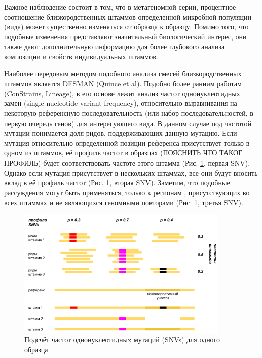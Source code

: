 \documentclass{spbau-diploma}
\begin{document}
Важное наблюдение состоит в том, что в метагеномной серии, процентное соотношение близкородственных штаммов определенной микробной популяции (вида) может существенно изменяться от образца к образцу. Помимо того, что подобные изменения представляют значительный биологический интерес, они также дают дополнительную информацию для более глубокого анализа композиции и свойств индивидуальных штаммов.

Наиболее передовым методом подобного анализа смесей близкородственных штаммов является DESMAN (Quince et al).
Подобно более ранним работам (ConStrains, Lineage), в его основе лежит анализ частот однонуклеотидных замен (single nucleotide variant frequency), относительно выравнивания на некоторую референсную последовательность (или набор последовательностей, в первую очередь генов) для интересующего вида. В данном случае под частотой мутации понимается доля ридов, поддерживающих данную мутацию. Если мутация относительно определенной позиции референса присутствует только в одном из штаммов, её профиль частот в образцах (ПОЯСНИТЬ ЧТО ТАКОЕ ПРОФИЛЬ) будет соответствовать частоте этого штамма (Рис. \ref{snv_profile}, первая SNV). Однако если мутация присутствует в нескольких штаммах, все они будут вносить вклад в её профиль частот (Рис. \ref{snv_profile}, вторая SNV). Заметим, что подобные рассуждения могут быть применяться, только к регионам , присутствующих во всех штаммах и не являющихся геномными повторами (Рис. \ref{snv_profile}, третья SNV). 


\begin{figure}[t]
\centering
\includegraphics[width=0.9\textwidth]{pics/snv_profiles.png}
\caption{Подсчёт частот однонуклеотидныx мутаций (SNVs) для одного образца}
\label{snv_profile}
\end{figure}
\end{document}
